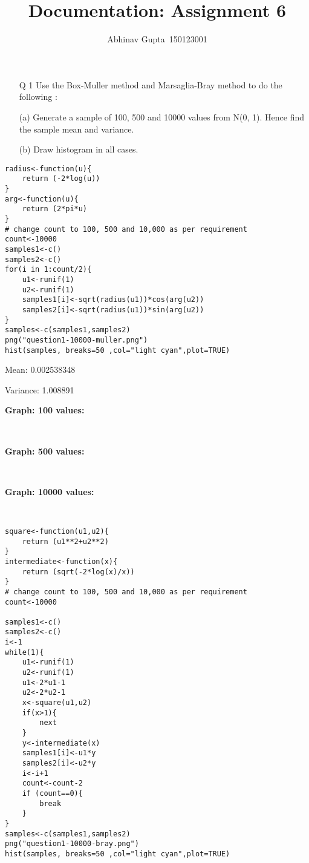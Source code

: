 \documentclass[11pt]{article}
\title{Documentation: Assignment 6}
\author{Abhinav Gupta\
 150123001}
\begin{document}
\titlepage
\newpage

\begin{enumerate}
\item[Q 1] Use the Box-Muller method and Marsaglia-Bray method to do the following :


(a) Generate a sample of 100, 500 and 10000 values from N(0, 1). Hence find the
sample mean and variance.


(b) Draw histogram in all cases.
\end{enumerate}


\begin{lstlisting}
radius<-function(u){
	return (-2*log(u))
}
arg<-function(u){
	return (2*pi*u)
}
# change count to 100, 500 and 10,000 as per requirement
count<-10000
samples1<-c()
samples2<-c()
for(i in 1:count/2){
	u1<-runif(1)
	u2<-runif(1)
	samples1[i]<-sqrt(radius(u1))*cos(arg(u2))
	samples2[i]<-sqrt(radius(u1))*sin(arg(u2))
}
samples<-c(samples1,samples2)
png("question1-10000-muller.png")
hist(samples, breaks=50 ,col="light cyan",plot=TRUE)
\end{lstlisting}



Mean:  0.002538348\

Variance:  1.008891 \

\textbf{Graph: 100 values: }\
\begin{figure}[H]
  \centering
 \\
\end{figure}
\textbf{Graph: 500 values: }\
\begin{figure}[H]
  \centering
 \\
\end{figure}
\textbf{Graph: 10000 values: }\
\begin{figure}[H]
  \centering
 \\
\end{figure}


\begin{lstlisting}
square<-function(u1,u2){
	return (u1**2+u2**2)
}
intermediate<-function(x){
	return (sqrt(-2*log(x)/x))
}
# change count to 100, 500 and 10,000 as per requirement
count<-10000

samples1<-c()
samples2<-c()
i<-1
while(1){
	u1<-runif(1)
	u2<-runif(1)
	u1<-2*u1-1
	u2<-2*u2-1
	x<-square(u1,u2)
	if(x>1){
		next
	}
	y<-intermediate(x)
	samples1[i]<-u1*y
	samples2[i]<-u2*y
	i<-i+1
	count<-count-2
	if (count==0){
		break
	}
}
samples<-c(samples1,samples2)
png("question1-10000-bray.png")
hist(samples, breaks=50 ,col="light cyan",plot=TRUE)		
\end{lstlisting}
\end{document}
